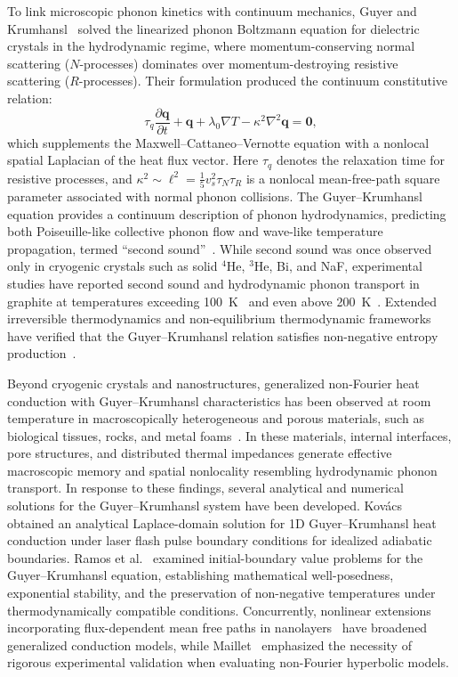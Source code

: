 \documentclass[preprint,12pt]{elsarticle}
\begin{document}
To link microscopic phonon kinetics with continuum mechanics, Guyer and Krumhansl~\cite{guyer1966solution,guyer1966thermal} solved the linearized phonon Boltzmann equation for dielectric crystals in the hydrodynamic regime, where momentum-conserving normal scattering ($N$-processes) dominates over momentum-destroying resistive scattering ($R$-processes). Their formulation produced the continuum constitutive relation:
\begin{equation}
\tau_q \frac{\partial \bm{q}}{\partial t} + \bm{q} + \lambda_0 \nabla T - \kappa^2 \nabla^2 \bm{q} = \bm{0},
\label{eq:gk_dimensional}
\end{equation}
which supplements the Maxwell--Cattaneo--Vernotte equation with a nonlocal spatial Laplacian of the heat flux vector. Here $\tau_q$ denotes the relaxation time for resistive processes, and $\kappa^2 \sim \ell^2 = \frac{1}{5} v_s^2 \tau_N \tau_R$ is a nonlocal mean-free-path square parameter associated with normal phonon collisions. The Guyer--Krumhansl equation provides a continuum description of phonon hydrodynamics, predicting both Poiseuille-like collective phonon flow and wave-like temperature propagation, termed ``second sound''~\cite{guyer1966thermal,chester1963second}. While second sound was once observed only in cryogenic crystals such as solid $^4\mathrm{He}$, $^3\mathrm{He}$, Bi, and NaF, experimental studies have reported second sound and hydrodynamic phonon transport in graphite at temperatures exceeding 100~K~\cite{huberman2019observation} and even above 200~K~\cite{ding2022observation}. Extended irreversible thermodynamics and non-equilibrium thermodynamic frameworks have verified that the Guyer--Krumhansl relation satisfies non-negative entropy production~\cite{jou2010extended,cimmelli2009different,sellitto2016mesoscopic}.

Beyond cryogenic crystals and nanostructures, generalized non-Fourier heat conduction with Guyer--Krumhansl characteristics has been observed at room temperature in macroscopically heterogeneous and porous materials, such as biological tissues, rocks, and metal foams~\cite{both2016deviation,van2017guyer}. In these materials, internal interfaces, pore structures, and distributed thermal impedances generate effective macroscopic memory and spatial nonlocality resembling hydrodynamic phonon transport. In response to these findings, several analytical and numerical solutions for the Guyer--Krumhansl system have been developed. Kov{\'a}cs~\cite{kovacs2018analytic} obtained an analytical Laplace-domain solution for 1D Guyer--Krumhansl heat conduction under laser flash pulse boundary conditions for idealized adiabatic boundaries. Ramos et al.~\cite{ramos2023mathematical,ramos2023nonnegativity} examined initial-boundary value problems for the Guyer--Krumhansl equation, establishing mathematical well-posedness, exponential stability, and the preservation of non-negative temperatures under thermodynamically compatible conditions. Concurrently, nonlinear extensions incorporating flux-dependent mean free paths in nanolayers~\cite{sellitto2025nonlinear} have broadened generalized conduction models, while Maillet~\cite{maillet2019review} emphasized the necessity of rigorous experimental validation when evaluating non-Fourier hyperbolic models.
\end{document}
